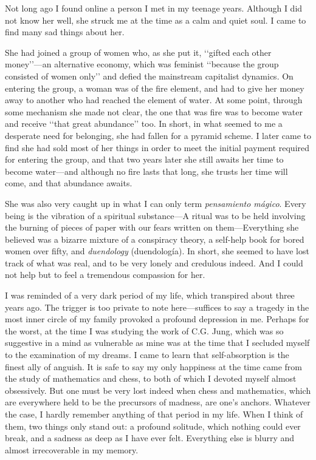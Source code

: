 \documentclass[a4paper]{article}
\begin{document}
Not long ago I found online a person I met in my teenage years. Although I did
not know her well, she struck me at the time as a calm and quiet soul. I came to
find many sad things about her. 

She had joined a group of women who, as she put it, \lq\lq gifted each other
money\rq\rq{}---an alternative economy, which was feminist \lq\lq because the
group consisted of women only\rq\rq{} and defied the mainstream capitalist
dynamics. On entering the group, a woman was of the fire element, and had to
give her money away to another who had reached the element of water. At some
point, through some mechanism she made not clear, the one that was fire
was to become water and receive \lq\lq that great abundance\rq\rq{} too. In
short, in what seemed to me a desperate need for belonging, she had fallen for a
pyramid scheme. I later came to find she had sold most of her things in order to
meet the initial payment required for entering the group, and that two years
later she still awaits her time to become water---and although no fire lasts
that long, she trusts her time will come, and that abundance awaits.

She was also very caught up in what I can only term \textit{pensamiento mágico}.
Every being is the vibration of a spiritual substance---A ritual was to be held
involving the burning of pieces of paper with our fears written on
them---Everything she believed was a bizarre mixture of a conspiracy theory,
a self-help book for bored women over fifty, and \textit{duendology}
(duendología). In short, she seemed to have lost track of what was real, and to
be very lonely and credulous indeed. And I could not help but to feel a
tremendous compassion for her.

I was reminded of a very dark period of my life, which transpired about three
years ago. The trigger is too private to note here---suffices to say a
tragedy in the most inner circle of my family provoked a profound depression in
me. Perhaps for the worst, at the time I was studying the work of C.G. Jung,
which was so suggestive in a mind as vulnerable as mine was at the time that I
secluded myself to the examination of my dreams. I came to learn that
self-absorption is the finest ally of anguish. It is safe  to say my only
happiness at the time came from the study of mathematics and chess, to both of which
I devoted myself almost obsessively. But one must be very lost indeed when chess
and mathematics, which are everywhere held to be the precursors of madness, are
one's anchors. Whatever the case, I hardly remember anything of that period in
my life. When I think of them, two things only stand out: a profound solitude,
which nothing could ever break, and a sadness as deep as I have ever felt.
Everything else is blurry and almost irrecoverable in my memory.
\end{document}
